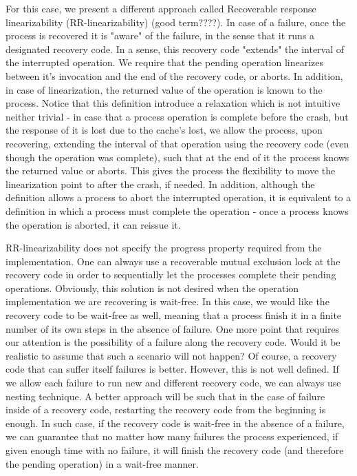 \documentclass{article}
\begin{document}
For this case, we present a different approach called Recoverable response linearizability (RR-linearizability) (good term????). In case of a failure, once the process is recovered it is "aware" of the failure, in the sense that it runs a designated recovery code. In a sense, this recovery code "extends" the interval of the interrupted operation. We require that the pending operation linearizes between it's invocation and the end of the recovery code, or aborts. In addition, in case of linearization, the returned value of the operation is known to the process. Notice that this definition introduce a relaxation which is not intuitive neither trivial - in case that a process operation is complete before the crash, but the response of it is lost due to the cache's lost, we allow the process, upon recovering, extending the interval of that operation using the recovery code (even though the operation was complete), such that at the end of it the process knows the returned value or aborts. This gives the process the flexibility to move the linearization point to after the crash, if needed. In addition, although the definition allows a process to abort the interrupted operation, it is equivalent to a definition in which a process must complete the operation - once a process knows the operation is aborted, it can reissue it.

RR-linearizability does not specify the progress property required from the implementation. One can always use a recoverable mutual exclusion lock at the recovery code in order to sequentially let the processes complete their pending operations. Obviously, this solution is not desired when the operation implementation we are recovering is wait-free. In this case, we would like the recovery code to be wait-free as well, meaning that a process finish it in a finite number of its own steps in the absence of failure. One more point that requires our attention is the possibility of a failure along the recovery code. Would it be realistic to assume that such a scenario will not happen? Of course, a recovery code that can suffer itself failures is better. However, this is not well defined. If we allow each failure to run new and different recovery code, we can always use nesting technique. A better approach will be such that in the case of failure inside of a recovery code, restarting the recovery code from the beginning is enough. In such case, if the recovery code is wait-free in the absence of a failure, we can guarantee that no matter how many failures the process experienced, if given enough time with no failure, it will finish the recovery code (and therefore the pending operation) in a wait-free manner.




\end{document}
